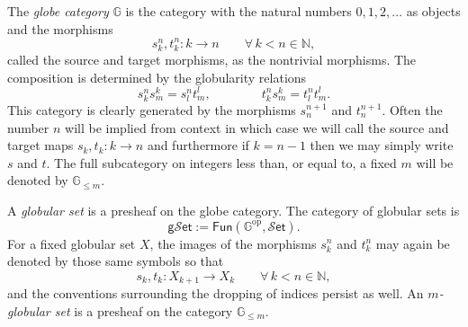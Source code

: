 \documentclass[12pt,a4paper]{article}
\numberwithin{equation}{section}
\newcommand{\gset}{\mathsf{g} \mathscr{S} \mathsf{et}}
\newcommand{\set}{\mathscr{S} \mathsf{et}}
\begin{document}
\begin{definition}
    The \emph{globe category} $\mathbb{G}$ is the category with the natural numbers $0, 1, 2, \dots$ as objects and the morphisms
    \begin{equation}
        s^n_k, t^n_k : k \xrightarrow{\quad} n \qquad \forall\, k < n \in \mathbb{N},
    \end{equation}
    called the source and target morphisms, as the nontrivial morphisms. The composition is determined by the globularity relations
    \begin{equation}
        s^n_k s^k_m = s^n_l t^l_m, \qquad \qquad t^n_k s^k_m = t^n_l t^l_m.
    \end{equation}
    This category is clearly generated by the morphisms $s^{n+1}_n$ and $t^{n+1}_n$. Often the number $n$ will be implied from context in which case we will call the source and target maps $s_k, t_k: k \to n$ and furthermore if $k = n - 1$ then we may simply write $s$ and $t$. The full subcategory on integers less than, or equal to, a fixed $m$ will be denoted by $\mathbb{G}_{\leq m}$.
\end{definition}

\begin{definition}
    A \emph{globular set} is a presheaf on the globe category. The category of globular sets is
    \begin{equation}
        \gset := \mathsf{Fun}(\mathbb{G}^{\mathrm{op}}, \set).
    \end{equation}
    For a fixed globular set $X$, the images of the morphisms $s^n_k$ and $t^n_k$ may again be denoted by those same symbols so that
    \begin{equation}
        s_k, t_k: X_{k+1} \xrightarrow{\quad} X_k \qquad \forall\, k < n \in \mathbb{N},
    \end{equation}
    and the conventions surrounding the dropping of indices persist as well. An \emph{$m$-globular set} is a presheaf on the category $\mathbb{G}_{\leq m}$.
\end{definition}
\end{document}
